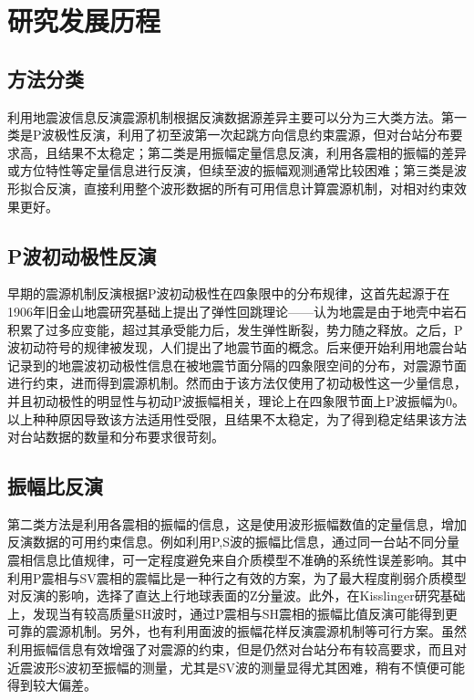 

\section{研究发展历程}

\subsection{方法分类}

利用地震波信息反演震源机制根据反演数据源差异主要可以分为三大类方法。第一类是P波极性反演，利用了初至波第一次起跳方向信息约束震源，但对台站分布要求高，且结果不太稳定；第二类是用振幅定量信息反演，利用各震相的振幅的差异或方位特性等定量信息进行反演，但续至波的振幅观测通常比较困难；第三类是波形拟合反演，直接利用整个波形数据的所有可用信息计算震源机制，对相对约束效果更好。

\subsection{P波初动极性反演}

早期的震源机制反演根据P波初动极性在四象限中的分布规律\citep{Balakina1961}，这首先起源于\citep{Reid1910}在1906年旧金山地震研究\citep{Milne1910}基础上提出了弹性回跳理论——认为地震是由于地壳中岩石积累了过多应变能，超过其承受能力后，发生弹性断裂，势力随之释放。之后，P波初动符号的规律被发现\cite{Nakano1923}，人们提出了地震节面的概念。后来便开始利用地震台站记录到的地震波初动极性信息在被地震节面分隔的四象限空间的分布，对震源节面进行约束，进而得到震源机制。然而由于该方法仅使用了初动极性这一少量信息，并且初动极性的明显性与初动P波振幅相关，理论上在四象限节面上P波振幅为0\citep{Stein2003}。以上种种原因导致该方法适用性受限，且结果不太稳定，为了得到稳定结果该方法对台站数据的数量和分布要求很苛刻。

\subsection{振幅比反演}

第二类方法是利用各震相的振幅的信息，这是使用波形振幅数值的定量信息，增加反演数据的可用约束信息。例如利用P,S波的振幅比信息，通过同一台站不同分量震相信息比值规律，可一定程度避免来自介质模型不准确的系统性误差影响。其中利用P震相与SV震相的震幅比\citep{Kisslinger1982,Kisslinger1980}是一种行之有效的方案，为了最大程度削弱介质模型对反演的影响，选择了直达上行地球表面的Z分量波。此外，在Kisslinger研究基础上，发现当有较高质量SH波时，通过P震相与SH震相的振幅比值反演可能得到更可靠的震源机制。另外，也有利用面波的振幅花样\citep{Stein2003}反演震源机制等可行方案。虽然利用振幅信息有效增强了对震源的约束，但是仍然对台站分布有较高要求，而且对近震波形S波初至振幅的测量，尤其是SV波的测量显得尤其困难，稍有不慎便可能得到较大偏差。

